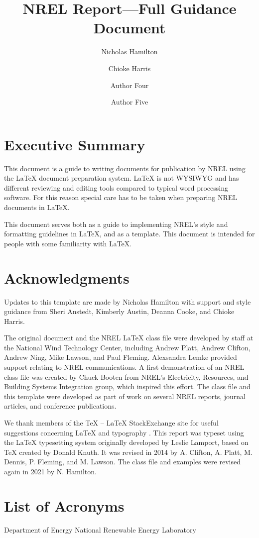 \documentclass[]{nrel}
\title{NREL Report---Full Guidance Document}
\author{Nicholas Hamilton}
\author{Chioke Harris}
\affil{National Renewable Energy Laboratory}
\author{Author Four}
\affil{Another affiliation}
\author{Author Five}
\affil{A third affiliation}
\begin{document}
\frontmatter
\chapter{Executive Summary}
This document is a guide to writing documents for publication by NREL using the LaTeX document preparation system. LaTeX is not WYSIWYG and has different reviewing and editing tools compared to typical word processing software. For this reason special care has to be taken when preparing NREL documents in LaTeX.

This document serves both as a guide to implementing NREL's style and formatting guidelines in LaTeX, and as a template. This document is intended for people with some familiarity with LaTeX.

\chapter{Acknowledgments}
Updates to this template are made by Nicholas Hamilton with support and style guidance from  Sheri Anstedt, Kimberly Austin, Deanna Cooke, and Chioke Harris.

The original document and the NREL LaTeX class file were developed by staff at the National Wind Technology Center, including Andrew Platt, Andrew Clifton, Andrew Ning, Mike Lawson, and Paul Fleming. Alexsandra Lemke provided support relating to NREL communications. A first demonstration of an NREL class file was created by Chuck Booten from NREL's Electricity, Resources, and Building Systems Integration group, which inspired this effort. The class file and this template were developed as part of work on several NREL reports, journal articles, and conference publications.

We thank members of the TeX -- LaTeX StackExchange site for useful suggestions concerning LaTeX and typography \citep{texstackexchange}.
This report was typeset using the LaTeX typesetting system originally developed by Leslie Lamport, based on TeX created by Donald Knuth. It was revised in 2014 by A. Clifton, A. Platt, M. Dennis, P. Fleming, and M. Lawson. The class file and examples were revised again in 2021 by N. Hamilton.

\chapter{List of Acronyms} %
\begin{acronym}[ICANN]
      {Department of Energy}
      {National Renewable Energy Laboratory}
\end{acronym}
\end{document}
